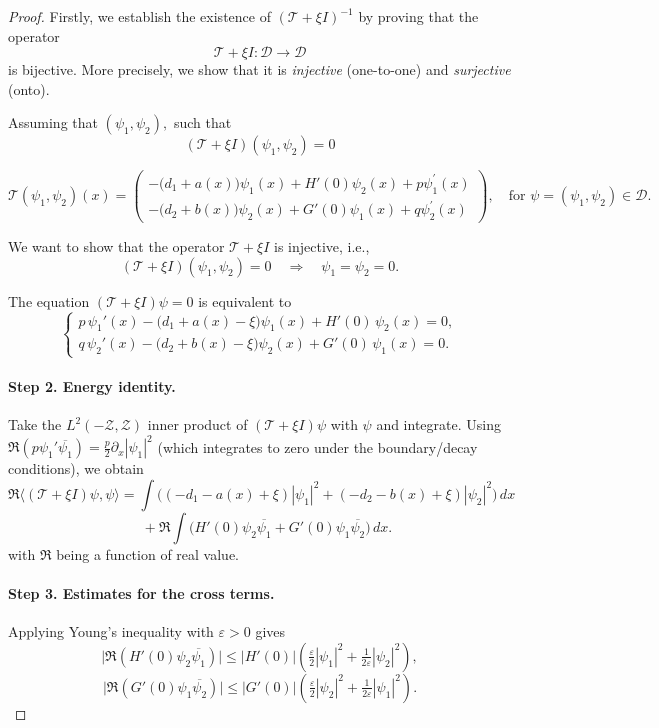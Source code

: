\documentclass[a4paper,11pt]{amsart}
\theoremstyle{definition}
\numberwithin{equation}{section}
\theoremstyle{definition}
\begin{document}
\begin{proof}

Firstly, we establish the existence of $(\mathscr{T}+\xi I)^{-1}$ by proving that the operator
\[
\mathscr{T}+\xi I : \mathcal{D} \to \mathcal{D}
\]
is bijective. More precisely, we show that it is
\emph{injective} (one-to-one) and \emph{surjective} (onto).

Assuming that $\left( \psi_1, \psi_2\right), $ such that
\begin{equation*}
\left(\mathscr{T}+\xi I\right)\left( \psi_1, \psi_2\right)=0
\end{equation*}

\[
\mathscr{T}(\psi_{1}, \psi_{2})(x) =
\begin{pmatrix}
 -\big(d_1  + a(x)\big) \psi_1(x) + H'(0) \psi_2(x)
+ p \psi_1^\prime(x) \\[1.2em]
 - \big(d_2  + b(x)\big) \psi_2(x) + G'(0) \psi_1(x)
+ q \psi_2^\prime(x)
\end{pmatrix},
\quad \text{for } \psi = (\psi_{1}, \psi_{2}) \in \mathcal{D}.
\]

We want to show that the operator $\mathscr{T} + \xi I$ is injective, i.e.,
\[
(\mathscr{T}+\xi I)(\psi_1,\psi_2)=0 \quad \Longrightarrow \quad \psi_1=\psi_2=0.
\]

The equation $(\mathscr{T}+\xi I)\psi=0$ is equivalent to
\[
\begin{cases}
p\,\psi_1'(x) - \big(d_1+a(x)-\xi\big)\psi_1(x) + H'(0)\,\psi_2(x)=0, \\[0.5em]
q\,\psi_2'(x) - \big(d_2+b(x)-\xi\big)\psi_2(x) + G'(0)\,\psi_1(x)=0.
\end{cases}
\]

\paragraph{Step 2. Energy identity.}
Take the $L^2(-\mathcal{Z}, \mathcal{Z})$ inner product of $(\mathscr{T}+\xi I)\psi$ with $\psi$ and integrate.
Using $\Re(p\psi_1'\overline{\psi_1}) = \tfrac{p}{2}\partial_x |\psi_1|^2$ (which integrates to zero under the boundary/decay conditions), we obtain
\[
\Re\langle (\mathscr{T}+\xi I)\psi,\psi\rangle
= \int \Big( (-d_1-a(x)+\xi)|\psi_1|^2 + (-d_2-b(x)+\xi)|\psi_2|^2 \Big)\,dx
\]
\[
\quad + \Re\int \big(H'(0)\psi_2\overline{\psi_1} + G'(0)\psi_1\overline{\psi_2}\big)\,dx.
\]
with $\Re$ being a function of real value.


\paragraph{Step 3. Estimates for the cross terms.}
Applying Young’s inequality with $\varepsilon>0$ gives
\[
\big|\Re(H'(0)\psi_2\overline{\psi_1})\big|
\leq |H'(0)|\left( \tfrac{\varepsilon}{2}|\psi_1|^2 + \tfrac{1}{2\varepsilon}|\psi_2|^2 \right),
\]
\[
\big|\Re(G'(0)\psi_1\overline{\psi_2})\big|
\leq |G'(0)|\left( \tfrac{\varepsilon}{2}|\psi_2|^2 + \tfrac{1}{2\varepsilon}|\psi_1|^2 \right).
\]


\end{proof}
\end{document}
